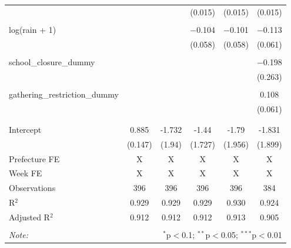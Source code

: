 \begin{table}[!htbp]
\begin{tabular}{@{\extracolsep{5pt}}lccccc}
  &  &  & (0.015) & (0.015) & (0.015) \\ 
  & & & & & \\ 
 log(rain + 1) &  &  & $-$0.104 & $-$0.101 & $-$0.113 \\ 
  &  &  & (0.058) & (0.058) & (0.061) \\ 
  & & & & & \\ 
 school\_closure\_dummy &  &  &  &  & $-$0.198 \\ 
  &  &  &  &  & (0.263) \\ 
  & & & & & \\ 
 gathering\_restriction\_dummy &  &  &  &  & 0.108 \\ 
  &  &  &  &  & (0.061) \\ 
  & & & & & \\ 
\hline \\[-1.8ex] 
Intercept & 0.885 & -1.732 & -1.44 & -1.79 & -1.831 \\ 
 & (0.147) & (1.94) & (1.727) & (1.956) & (1.899) \\ 
Prefecture FE & X & X & X & X & X \\ 
Week FE & X & X & X & X & X \\ 
Observations & 396 & 396 & 396 & 396 & 384 \\ 
R$^{2}$ & 0.929 & 0.929 & 0.929 & 0.930 & 0.924 \\ 
Adjusted R$^{2}$ & 0.912 & 0.912 & 0.912 & 0.913 & 0.905 \\ 
\hline 
\hline \\[-1.8ex] 
\textit{Note:}  & \multicolumn{5}{r}{$^{*}$p$<$0.1; $^{**}$p$<$0.05; $^{***}$p$<$0.01} \\ 
\end{tabular} 
\end{table} 
